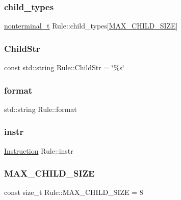 \subsubsection{\texorpdfstring{child\+\_\+types}{child\_types}}
{\footnotesize\ttfamily \hyperlink{_nonterminal_8h_a5c1f658dc7560600a16d22408bd716ca}{nonterminal\+\_\+t} Rule\+::child\+\_\+types\mbox{[}\hyperlink{class_rule_ac78a2201dfba27f803111205396f0027}{M\+A\+X\+\_\+\+C\+H\+I\+L\+D\+\_\+\+S\+I\+ZE}\mbox{]}\hspace{0.3cm}{\ttfamily [protected]}}

\mbox{\label{class_rule_a3ffb425ebd6c508ca47234e3800f769c}} 
\subsubsection{\texorpdfstring{Child\+Str}{ChildStr}}
{\footnotesize\ttfamily const std\+::string Rule\+::\+Child\+Str = \char`\"{}\%s\char`\"{}\hspace{0.3cm}{\ttfamily [static]}}

\mbox{\label{class_rule_aa48c15aaaf5242afea0439607f2a2177}} 
\subsubsection{\texorpdfstring{format}{format}}
{\footnotesize\ttfamily std\+::string Rule\+::format}

\mbox{\label{class_rule_a367e578f5e1427ef04d1d77477565c67}} 
\subsubsection{\texorpdfstring{instr}{instr}}
{\footnotesize\ttfamily \hyperlink{class_instruction}{Instruction} Rule\+::instr}

\mbox{\label{class_rule_ac78a2201dfba27f803111205396f0027}} 
\subsubsection{\texorpdfstring{M\+A\+X\+\_\+\+C\+H\+I\+L\+D\+\_\+\+S\+I\+ZE}{MAX\_CHILD\_SIZE}}
{\footnotesize\ttfamily const size\+\_\+t Rule\+::\+M\+A\+X\+\_\+\+C\+H\+I\+L\+D\+\_\+\+S\+I\+ZE = 8\hspace{0.3cm}{\ttfamily [static]}}

